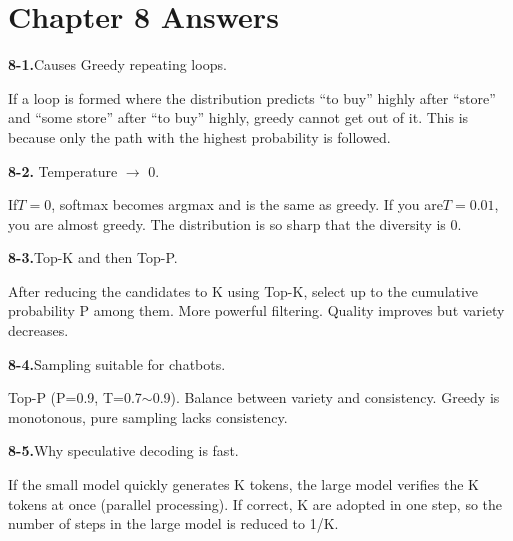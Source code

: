 \section{Chapter 8 Answers}

\textbf{8-1.}Causes Greedy repeating loops.

If a loop is formed where the distribution predicts ``to buy'' highly after ``store'' and ``some store'' after ``to buy'' highly, greedy cannot get out of it. This is because only the path with the highest probability is followed.

\textbf{8-2.} Temperature $\to$ 0.

If$T=0$, softmax becomes argmax and is the same as greedy.  If you are$T=0.01$, you are almost greedy. The distribution is so sharp that the diversity is 0.

\textbf{8-3.}Top-K and then Top-P.

After reducing the candidates to K using Top-K, select up to the cumulative probability P among them. More powerful filtering. Quality improves but variety decreases.

\textbf{8-4.}Sampling suitable for chatbots.

Top-P (P=0.9, T=0.7$\sim$0.9). Balance between variety and consistency. Greedy is monotonous, pure sampling lacks consistency.

\textbf{8-5.}Why speculative decoding is fast.

If the small model quickly generates K tokens, the large model verifies the K tokens at once (parallel processing). If correct, K are adopted in one step, so the number of steps in the large model is reduced to 1/K.

